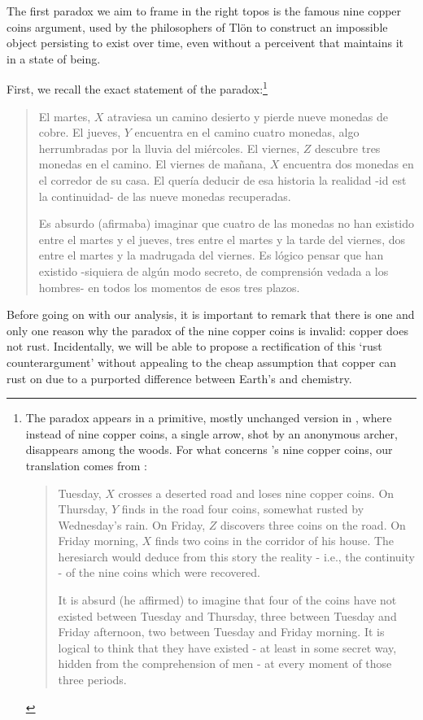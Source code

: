 The first paradox we aim to frame in the right topos is the famous nine copper coins argument, used by the philosophers of Tlön to construct an impossible object persisting to exist over time, even without a perceivent that maintains it in a state of being.
\begin{example}\label{bla}
  First, we recall the exact statement of the paradox:\footnote{The paradox appears in a primitive, mostly unchanged version in \cite{borges1997otras}, where instead of nine copper coins, a single arrow, shot by an anonymous archer, disappears among the woods. For what concerns \tlon's  nine copper coins, our translation comes from \cite{tlonEN}:
    \begin{quote}
      \hspace{.5em} Tuesday, $X$ crosses a deserted road and loses nine copper coins. On Thursday, $Y$ finds in the road four coins, somewhat rusted by Wednesday's rain. On Friday, $Z$ discovers three coins on the road. On Friday morning, $X$ finds two coins in the corridor of his house. The heresiarch would deduce from this story the reality - i.e., the continuity - of the nine coins which were recovered.

      \hspace{.5em} It is absurd (he affirmed) to imagine that four of the coins have not existed between Tuesday and Thursday, three between Tuesday and Friday afternoon, two between Tuesday and Friday morning. It is logical to think that they have existed - at least in some secret way, hidden from the comprehension of men - at every moment of those three periods.
    \end{quote}}
  \begin{quote}
    El martes, $X$ atraviesa un camino desierto y pierde nueve monedas de cobre.
    El jueves, $Y$ encuentra en el camino cuatro monedas, algo herrumbradas por la lluvia del miércoles. El viernes, $Z$ descubre tres monedas en el camino. El viernes de mañana, $X$ encuentra dos monedas en el corredor de su casa. El  quería deducir de esa historia la realidad -id est la continuidad- de las nueve monedas recuperadas.

    Es absurdo (afirmaba) imaginar que cuatro de las monedas no han existido entre el martes y el jueves, tres entre el martes y la tarde del viernes, dos entre el martes y la madrugada del viernes. Es lógico pensar que han existido -siquiera de algún modo secreto, de comprensión vedada a los hombres- en todos los momentos de esos tres plazos.
  \end{quote}
  Before going on with our analysis, it is important to remark that there is one and only one reason why the paradox of the nine copper coins is invalid: copper does not rust. Incidentally, we will be able to propose a rectification of this `rust counterargument' without appealing to the cheap assumption that copper can rust on \tlon due to a purported difference between Earth's and \tlonian chemistry.


\end{example}
